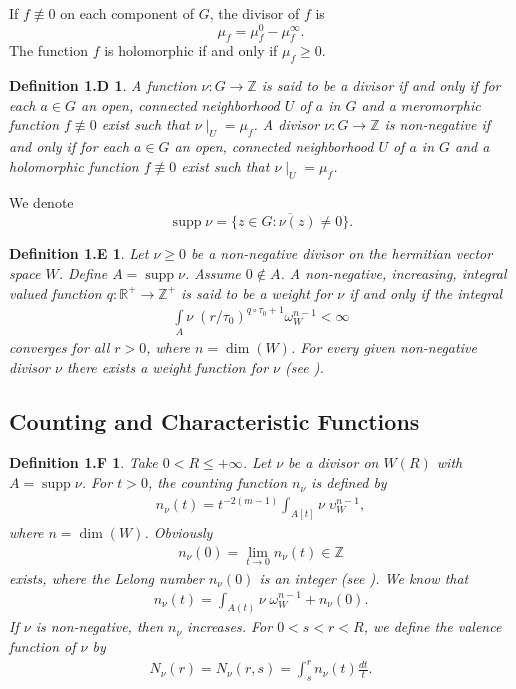 \documentclass[11pt,reqno]{amsart}
\newtheorem*{defi1D}{Definition 1.D}
\newtheorem*{defi1E}{Definition 1.E}
\newtheorem*{defi1F}{Definition 1.F}
\numberwithin{equation}{section}
\begin{document}
If $f\not\equiv0$ on each component of $G$, the divisor of $f$ is
\[
\mu_f=\mu_f^0-\mu_f^\infty.
\]
The function $f$ is holomorphic if and only if $\mu_f\ge0$.

\begin{defi1D}\cite[pp. 13]{Stoll-1974}
A function $\nu:G\to \mathbb{Z}$ is said to be a divisor if and only if for each $a\in G$ an open, connected neighborhood $U$ of $a$ in $G$ and a meromorphic function $f\not\equiv 0$ exist such that $\nu\mid_{U}=\mu_f$. A divisor $\nu:G\to \mathbb{Z}$ is non-negative if and only if for each $a\in G$ an open, connected neighborhood $U$ of $a$ in $G$ and a holomorphic function $f\not\equiv 0$ exist such that $\nu\mid_{U}=\mu_f$.
\end{defi1D}

We denote
\[
\operatorname{supp}\nu=\overline{\{z\in G:\nu(z)\ne0\}}.
\]


\begin{defi1E}\cite[pp. 26]{Stoll-1974} Let $\nu\geq 0$ be a non-negative divisor on the hermitian vector space $W$. Define $A=\displaystyle \operatorname{supp}\nu$. Assume $0\not\in A$. A non-negative, increasing, integral valued function $q:\mathbb{R}^+\to \mathbb{Z}^+$ is said to be a weight for $\nu$ if and only if the integral
	\begin{align*}
		\int\limits_{A} \nu\;\left(r/\tau_0\right)^{q\circ\tau_0+1}\omega_W^{n-1}<\infty
	\end{align*}
	converges for all $r>0$, where $n=\dim(W)$. For every given non-negative divisor $\nu$ there exists a weight function for $\nu$ (see \cite{Stoll-1953}).
\end{defi1E}
\subsection*{Counting and Characteristic Functions}

\begin{defi1F} Take $0<R\leq +\infty$. Let $\nu$ be a divisor on $W(R)$ with $A=\displaystyle \operatorname{supp}\nu$. For $t>0$, the counting function $n_{\nu}$ is defined by
\begin{align*}
 \displaystyle n_{\nu}(t)=t^{-2(m-1)}\int_{A[t]}\nu\; \upsilon_W^{n-1},
 \end{align*}
where $n=\dim(W)$.
Obviously 
\begin{align*}
n_{\nu}(0)=\lim\limits_{t\to 0}n_{\nu}(t)\in\mathbb{Z}
\end{align*}
exists, where the Lelong number $n_{\nu}(0)$ is an integer (see \cite[Theorem 3.1]{Stoll-1974}). We know that
\begin{align*}
 \displaystyle n_{\nu}(t)=\int_{A(t)}\nu\;\omega_W^{n-1}+n_{\nu}(0).
 \end{align*}
If $\nu$ is non-negative, then $n_{\nu}$ increases. For $0<s<r<R$, we define the valence function of $\nu$ by
\begin{align*}
N_{\nu}(r)=N_{\nu}(r,s)=\int_{s}^r n_{\nu}(t)\frac{dt}{t}.
\end{align*}
\end{defi1F}
\end{document}
